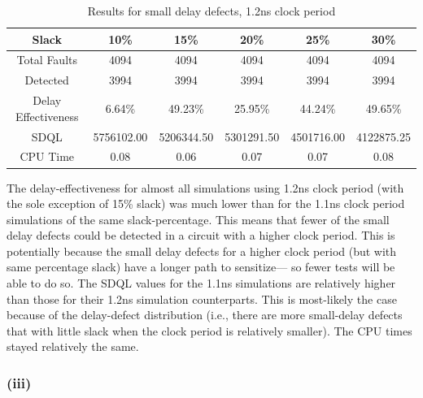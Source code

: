 \documentclass[letterpaper]{article} %
\begin{document}
\begin{table}[ht]
\centering
\begin{tabular}{|c|c|c|c|c|c|}
\hline
Slack               & 10\%           & 15\%            & 20\%            & 25\%            & 30\%            \\ \hline
Total Faults        & 4094           & 4094            & 4094            & 4094            & 4094            \\ \hline
Detected            & 3994           & 3994            & 3994            & 3994            & 3994            \\ \hline
Delay Effectiveness & 6.64\% & 49.23\% & 25.95\% & 44.24\% & 49.65\% \\ \hline
SDQL                & 5756102.00     & 5206344.50      & 5301291.50      & 4501716.00      & 4122875.25      \\ \hline
CPU Time            & 0.08           & 0.06            & 0.07            & 0.07            & 0.08            \\ \hline
\end{tabular}
\caption{Results for small delay defects, 1.2ns clock period}
\end{table}
The delay-effectiveness for almost all simulations using 1.2ns clock period (with the sole exception of 15\% slack) was much lower than for the 1.1ns clock period simulations of the same slack-percentage. This means that fewer of the small delay defects could be detected in a circuit with a higher clock period. This is potentially because the small delay defects for a higher clock period (but with same percentage slack) have a longer path to sensitize--- so fewer tests will be able to do so. The SDQL values for the 1.1ns simulations are relatively higher than those for their 1.2ns simulation counterparts. This is most-likely the case because of the delay-defect distribution (i.e., there are more small-delay defects that with little slack when the clock period is relatively smaller). The CPU times stayed relatively the same.

\subsubsection*{(iii)}
\end{document}
